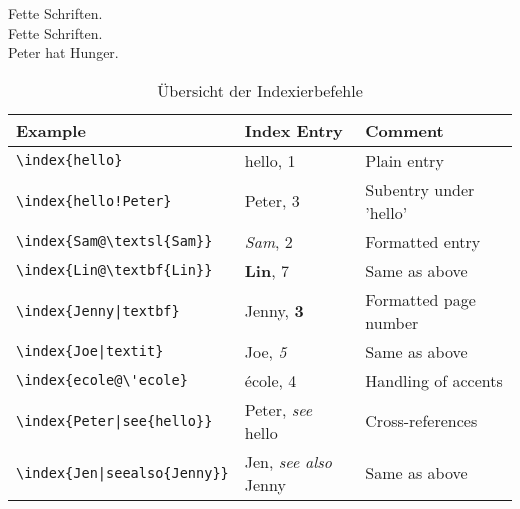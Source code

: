 \documentclass[10pt]{article}
\begin{document}
\noindent Fette Schriften.\\
Fette Schriften.\\
Peter hat Hunger.

\begin{table}[htdp]
\caption{Übersicht der Indexierbefehle}
\begin{center}
\begin{tabular}{|l|l|l|}
\hline
Example &	Index Entry	 & Comment\\
\hline
\verb+\index{hello}+ &	hello, 1	& Plain entry \\
\verb+\index{hello!Peter}+	&  Peter, 3	 &Subentry under 'hello'\\
\verb+\index{Sam@\textsl{Sam}}+&	\textsl{Sam}, 2	&Formatted entry\\
\verb+\index{Lin@\textbf{Lin}}	+&	\textbf{Lin}, 7	&Same as above\\
\verb+\index{Jenny|textbf}+&	Jenny, \textbf{3}	&Formatted page number\\
\verb+\index{Joe|textit}+&	Joe, \textit{5}	&Same as above\\
\verb+\index{ecole@\'ecole}+&	école, 4&	Handling of accents\\
\verb+\index{Peter|see{hello}}+&	Peter, \textit{see} hello	&Cross-references\\
\verb+\index{Jen|seealso{Jenny}}+ &	Jen, \textit{see also} Jenny	&Same as above\\
\hline

\end{tabular}
\end{center}
\label{default}
\end{table}%

\printindex %
\end{document}
